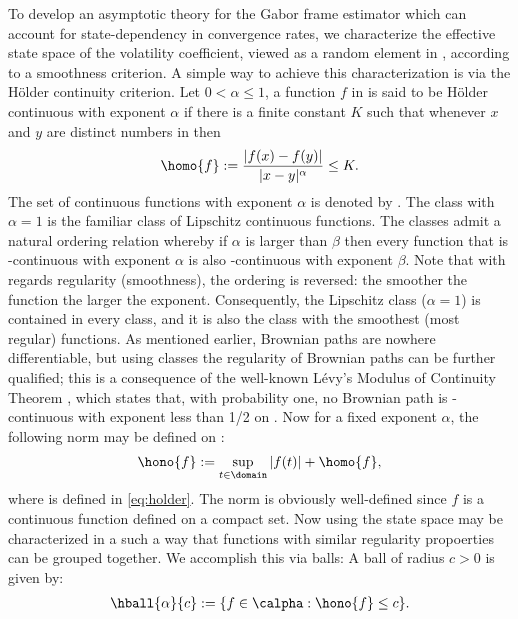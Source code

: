 To develop an asymptotic theory for the Gabor frame estimator which can account for state-dependency in convergence rates, we characterize the effective  state space of the volatility coefficient, viewed as a random element in \state, according to a smoothness criterion.
A simple way to achieve this characterization is via the H\"older continuity criterion. Let $0 < \alpha \le 1$, a function $f$ in \state is said to be H\"older continuous with exponent $\alpha$ if  there is a finite constant $K$ such that whenever $x$ and $y$ are distinct numbers in \domain then 
\begin{align}
  \homo{f} := \frac{\vert f(x) - f(y)\vert}{\vert x - y \vert^\alpha} \le K. 
  \label{eq:holder}
\end{align}
The set of \holder continuous functions with exponent $\alpha$ is denoted by \calpha. The \holder class with $\alpha = 1$ is the familiar class of Lipschitz continuous functions. The \holder classes admit a natural ordering relation whereby if $\alpha$ is larger than  $\beta$ then every function that is \holder-continuous with exponent $\alpha$ is also  \holder-continuous with exponent $\beta$. Note that with regards regularity (smoothness), the ordering is reversed: the smoother the function the larger the \holder exponent. Consequently, the Lipschitz class ($ \alpha = 1$) is contained in every \holder class, and it is also the class with the smoothest (most regular) functions. As mentioned earlier, Brownian paths are nowhere differentiable, but using \holder classes the regularity of Brownian paths can be further qualified; this is a consequence of  the well-known L\'evy's Modulus of Continuity Theorem \citep[Theorem I.10.2]{Williams2000}, which states that, with probability one, no Brownian path is \holder-continuous with exponent less than 1/2 on \domain.   
Now for a fixed exponent $\alpha$, the following norm may be defined on \calpha:
\begin{align}
  \hono{f} := \sup_{t \in \domain} |f(t)| + \homo{f},\notag
  \label{}
\end{align}
where  is defined in \eqref{eq:holder}. The norm is obviously well-defined since $f$ is a continuous function defined on a compact set. Now using \hono{\cdot}  the state space may be characterized in a such a way that functions with similar regularity propoerties can be grouped together. We accomplish this via \holder balls: A \holder ball  of radius $c > 0$ is given by:
\begin{align}
  \hball{\alpha}{c}  := \{f \in \calpha : \hono{f} \le c\}.\notag
  \label{}
\end{align}

